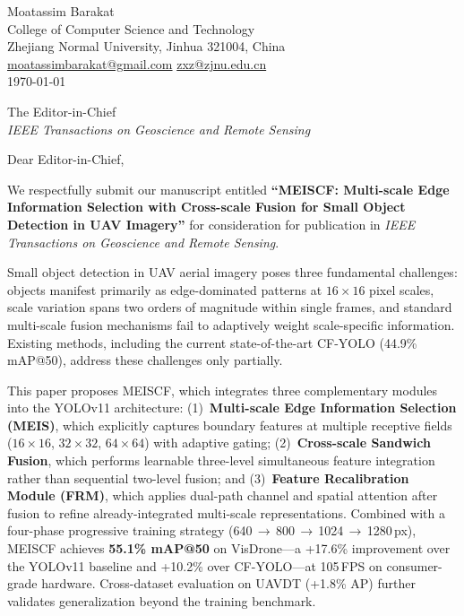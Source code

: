 \documentclass[11pt, a4paper]{article}
\begin{document}
\begin{flushright}
    Moatassim Barakat \\
    College of Computer Science and Technology \\
    Zhejiang Normal University, Jinhua 321004, China \\
    \href{mailto:moatassimbarakat@gmail.com}{moatassimbarakat@gmail.com}
    \quad
    \href{mailto:zxz@zjnu.edu.cn}{zxz@zjnu.edu.cn} \\[4pt]
    \today
\end{flushright}

\bigskip

The Editor-in-Chief \\
\textit{IEEE Transactions on Geoscience and Remote Sensing}

\bigskip

Dear Editor-in-Chief,

We respectfully submit our manuscript entitled \textbf{``MEISCF: Multi-scale
Edge Information Selection with Cross-scale Fusion for Small Object Detection
in UAV Imagery''} for consideration for publication in \textit{IEEE
Transactions on Geoscience and Remote Sensing}.

Small object detection in UAV aerial imagery poses three fundamental
challenges: objects manifest primarily as edge-dominated patterns at
$16{\times}16$ pixel scales, scale variation spans two orders of magnitude
within single frames, and standard multi-scale fusion mechanisms fail to
adaptively weight scale-specific information. Existing methods, including the
current state-of-the-art CF-YOLO (44.9\% mAP@50), address these challenges
only partially.

This paper proposes MEISCF, which integrates three complementary modules into
the YOLOv11 architecture: (1)~\textbf{Multi-scale Edge Information Selection
(MEIS)}, which explicitly captures boundary features at multiple receptive
fields ($16{\times}16$, $32{\times}32$, $64{\times}64$) with adaptive gating;
(2)~\textbf{Cross-scale Sandwich Fusion}, which performs learnable three-level
simultaneous feature integration rather than sequential two-level fusion; and
(3)~\textbf{Feature Recalibration Module (FRM)}, which applies dual-path
channel and spatial attention after fusion to refine already-integrated
multi-scale representations. Combined with a four-phase progressive training
strategy (640\,$\to$\,800\,$\to$\,1024\,$\to$\,1280\,px), MEISCF achieves
\textbf{55.1\% mAP@50} on VisDrone---a +17.6\% improvement over the YOLOv11
baseline and +10.2\% over CF-YOLO---at 105\,FPS on consumer-grade hardware.
Cross-dataset evaluation on UAVDT (+1.8\% AP) further validates
generalization beyond the training benchmark.
\end{document}

